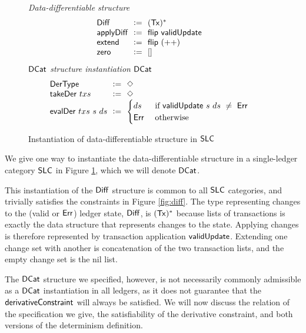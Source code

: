 \begin{figure*}[htb]
  \emph{Data-differentiable structure}
  \begin{equation*}
    \begin{array}{l@{~\leteq~}l@{~~~~}lr}
      \Diff~&~\seqof{(\type{Tx})} \\
      \fun{applyDiff}~&~\fun{flip}~\fun{validUpdate} \\
      \fun{extend} ~&~\fun{flip}~(++) \\
      \fun{zero}~&~[]
    \end{array}
  \end{equation*}
  \emph{$\mathsf{DCat}$ structure instantiation $\mathsf{DCat}$}
  \begin{equation*}
    \begin{array}{l@{~\leteq~}l@{~~~~}lr}
      \type{DerType}~&~\Nt \\
      \fun{takeDer}~txs~&~\Nt \\
      \fun{evalDer}~txs~s~ds~&~\begin{cases}
        ds & \text{ if } \fun{validUpdate}~s~ds~\neq~\Err \\
        \Err & \text{ otherwise}
      \end{cases} \\
    \end{array}
  \end{equation*}
  \caption{Instantiation of data-differentiable structure in $\mathsf{SLC}$ }
  \label{fig:diff-cat-inst}
\end{figure*}


We give one way to instantiate the data-differentiable structure in a single-ledger
category $\mathsf{SLC}$ in Figure \ref{fig:diff-cat-inst}, which we will denote
$\mathsf{DCat}$.

This instantiation of the $\mathsf{Diff}$ structure is common to all $\mathsf{SLC}$ categories,
and trivially satisfies the constraints in Figure \ref{fig:diff}.
The type representing
changes to the (valid or $\mathsf{Err}$) ledger state, $\mathsf{Diff}$, is $(\mathsf{Tx})^{*}$
because lists of transactions is exactly the data structure that represents
changes to the state. Applying changes is therefore represented by transaction application
$\mathsf{validUpdate}$. Extending one change set with another is concatenation of
the two transaction lists, and the empty change set is the nil list.

The $\mathsf{DCat}$ structure we specified, however, is not necessarily
commonly admissible as a $\mathsf{DCat}$ instantiation in all ledgers,
as it does not guarantee that the $\mathsf{derivativeConstraint}$ will always be satisfied.
We will now discuss the relation of the specification we give, the satisfiability of
the derivative constraint, and both versions of the determinism definition.

